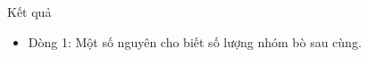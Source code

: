 Kết quả
\begin{itemize}
	\item     Dòng 1: Một số nguyên cho biết số lượng nhóm bò sau cùng.   
\end{itemize}